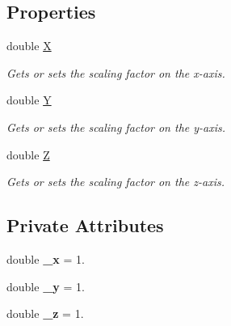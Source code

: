 \subsection*{Properties}
\begin{DoxyCompactItemize}
\item 
double \hyperlink{class_lib_noise_1_1_operator_1_1_scale_a30c3adb3d8a41a423b5fc21f52267f11}{X}
\begin{DoxyCompactList}\small\item\em Gets or sets the scaling factor on the x-\/axis. \end{DoxyCompactList}\item 
double \hyperlink{class_lib_noise_1_1_operator_1_1_scale_af5e3bff1fbf716cfc298c45530e21974}{Y}
\begin{DoxyCompactList}\small\item\em Gets or sets the scaling factor on the y-\/axis. \end{DoxyCompactList}\item 
double \hyperlink{class_lib_noise_1_1_operator_1_1_scale_ab3a3eaf355fc76ecd167e2dce9878d76}{Z}
\begin{DoxyCompactList}\small\item\em Gets or sets the scaling factor on the z-\/axis. \end{DoxyCompactList}\end{DoxyCompactItemize}
\subsection*{Private Attributes}
\begin{DoxyCompactItemize}
\item 
\mbox{\label{class_lib_noise_1_1_operator_1_1_scale_a5ac0121c785ffdebec9f269f34c97cae}} 
double {\bfseries \+\_\+x} = 1.
\item 
\mbox{\label{class_lib_noise_1_1_operator_1_1_scale_a6de7bea44841fd2c7e36ca0ba51e5dc4}} 
double {\bfseries \+\_\+y} = 1.
\item 
\mbox{\label{class_lib_noise_1_1_operator_1_1_scale_a57dce0797da184df6fa1948f0a81933c}} 
double {\bfseries \+\_\+z} = 1.
\end{DoxyCompactItemize}
